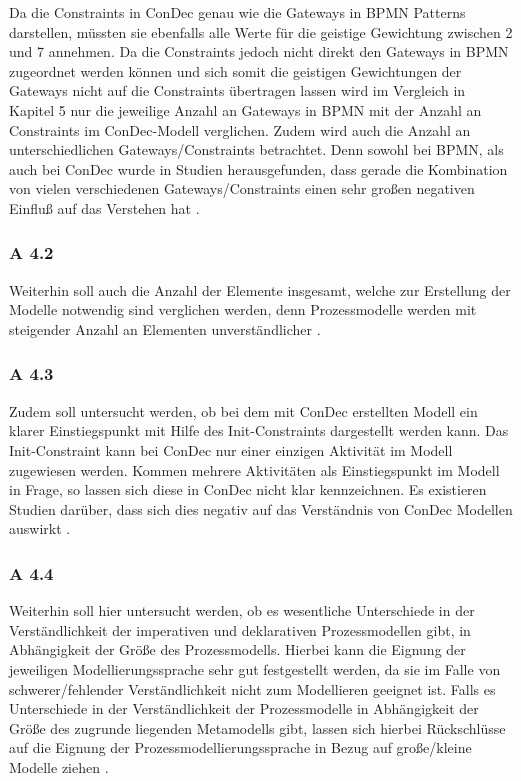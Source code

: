 Da die Constraints in ConDec genau wie die Gateways in BPMN Patterns darstellen, müssten sie ebenfalls alle Werte für die geistige Gewichtung zwischen 2 und 7 annehmen. Da die Constraints jedoch nicht direkt den Gateways in BPMN zugeordnet werden können und sich somit die geistigen Gewichtungen der Gateways nicht auf die Constraints übertragen lassen wird im Vergleich in Kapitel 5 nur die jeweilige Anzahl an Gateways in BPMN mit der Anzahl an Constraints im ConDec-Modell verglichen. \newline
Zudem wird auch die Anzahl an unterschiedlichen Gateways/Constraints betrachtet. Denn sowohl bei BPMN, als auch bei ConDec wurde in Studien herausgefunden, dass gerade die Kombination von vielen verschiedenen Gateways/Constraints einen sehr großen negativen Einfluß auf das Verstehen hat \cite{gruhn2006adopting, thesis_maja,haisjackl2014understanding}. \newline

\subsubsection{A 4.2}

Weiterhin soll auch die Anzahl der Elemente insgesamt, welche zur Erstellung der Modelle notwendig sind verglichen werden, denn Prozessmodelle werden mit steigender Anzahl an Elementen unverständlicher \cite{leimeister2012, journals95, freund2007,reinshagen2009}. 


\subsubsection{A 4.3}
Zudem soll untersucht werden, ob bei dem mit ConDec erstellten Modell ein klarer Einstiegspunkt mit Hilfe des Init-Constraints dargestellt werden kann. Das Init-Constraint kann bei ConDec nur einer einzigen Aktivität im Modell zugewiesen werden. Kommen mehrere Aktivitäten als Einstiegspunkt im Modell in Frage, so lassen sich diese in ConDec nicht klar kennzeichnen. Es existieren Studien darüber, dass sich dies negativ auf das Verständnis von ConDec Modellen auswirkt \cite{haisjackl2014understanding}. \newline

\subsubsection{A 4.4}
Weiterhin soll hier untersucht werden, ob es wesentliche Unterschiede in der Verständlichkeit der imperativen und deklarativen Prozessmodellen gibt, in Abhängigkeit der Größe des Prozessmodells. Hierbei kann die Eignung der jeweiligen Modellierungssprache sehr gut festgestellt werden, da sie im Falle von schwerer/fehlender Verständlichkeit nicht zum Modellieren geeignet ist. Falls es Unterschiede in der Verständlichkeit der Prozessmodelle in Abhängigkeit der Größe des zugrunde liegenden Metamodells gibt, lassen sich hierbei Rückschlüsse auf die Eignung der Prozessmodellierungssprache in Bezug auf große/kleine Modelle ziehen \cite{leimeister2012,journals95, freund2007,reinshagen2009, becker2012prozessmanagement,koch2011,bpm07,thesis_maja}.


